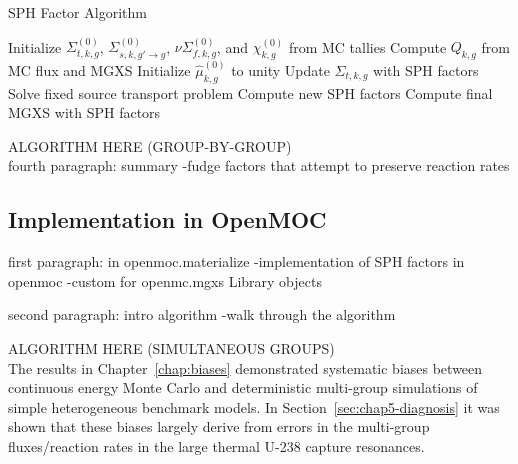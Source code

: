 \begin{algorithm}[h]
\caption{SPH Factor Algorithm}
\label{alg:chap6-sph}
\begin{algorithmic}[1]
  \State Initialize $\Sigma_{t,k,g}^{(0)}$, $\Sigma_{s,k,g'\rightarrow g}^{(0)}$, $\nu\Sigma_{f,k,g}^{(0)}$, and $\chi_{k,g}^{(0)}$ from MC tallies 
  \State Compute $Q_{k,g}$ from MC flux and \ac{MGXS} 
  \State Initialize $\hat{\mu}_{k,g}^{(0)}$ to unity
    \State Update $\Sigma_{t,k,g}$ with \ac{SPH} factors 
    \State Solve fixed source transport problem\footnotemark {}
    \State Compute new \ac{SPH} factors 
  \EndWhile
  \State Compute final \ac{MGXS} with \ac{SPH} factors 
\end{algorithmic}
\end{algorithm}


ALGORITHM HERE (GROUP-BY-GROUP)\\

fourth paragraph: summary
-fudge factors that attempt to preserve reaction rates


\subsection{Implementation in OpenMOC}
\label{subsec:chap6-sph-openmoc}

first paragraph: in openmoc.materialize
-implementation of SPH factors in openmoc
-custom for openmc.mgxs Library objects

second paragraph: intro algorithm
-walk through the algorithm

ALGORITHM HERE (SIMULTANEOUS GROUPS)\\


The results in Chapter~\ref{chap:biases} demonstrated systematic biases between continuous energy Monte Carlo and deterministic multi-group simulations of simple heterogeneous benchmark models. In Section~\ref{sec:chap5-diagnosis} it was shown that these biases largely derive from errors in the multi-group fluxes/reaction rates in the large thermal U-238 capture resonances. 

